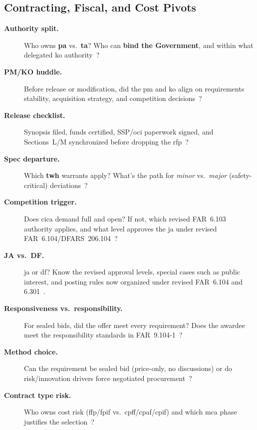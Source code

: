 \documentclass[../main.tex]{subfiles}
\begin{document}
\subsection{Contracting, Fiscal, and Cost Pivots}
\begin{description}
  \item[\textbf{Authority split.}] Who owns \textbf{\ac{pa}} vs.\ \textbf{\ac{ta}}? Who can \textbf{bind the Government}, and within what delegated \ac{ko} authority~\autocite{SECNAV5400-15D,SECNAV5000-2G,FAR-1-602-Contracting-Officer-Authority}?
  \item[\textbf{PM/KO huddle.}] Before release or modification, did the \ac{pm} and \ac{ko} align on requirements stability, acquisition strategy, and competition decisions~\autocite{DoDI5000-85,edo-3-2-1-intro-contracting-2025}?
  \item[\textbf{Release checklist.}] Synopsis filed, funds certified, SSP/\ac{oci} paperwork signed, and Sections~L/M synchronized before dropping the \ac{rfp}~\autocite{FAR-5-101-Disseminating-Information,FAR-15-304-Evaluation-Factors,NAVSEA-Source-Selection-Guide-2022,edo-3-2-2-solicitation-prep-2025}?
  \item[\textbf{Spec departure.}] Which \textbf{\ac{twh}} warrants apply? What's the path for \emph{minor} vs.\ \emph{major} (safety-critical) deviations~\autocite{SECNAV5400-15D}?
  \item[\textbf{Competition trigger.}] Does \ac{cica} demand full and open? If not, which revised FAR~6.103 authority applies, and what level approves the \acs{ja} under revised FAR~6.104/DFARS~206.104~\autocite{USC-3201-CICA,FAR-Overhaul-Part6-2026,DoD-RFO-Deviation-Part6-2026}?
  \item[\textbf{JA vs.\ DF.}] \ac{ja} or \ac{df}? Know the revised approval levels, special cases such as public interest, and posting rules now organized under revised FAR~6.104 and 6.301~\autocite{FAR-Overhaul-Part6-2026,DoD-RFO-Deviation-Part6-2026}.
  \item[\textbf{Responsiveness vs.\ responsibility.}] For sealed bids, did the offer meet every requirement? Does the awardee meet the responsibility standards in FAR~9.104-1~\autocite{FAR-9-104-1-General-Standards}?
  \item[\textbf{Method choice.}] Can the requirement be sealed bid (price-only, no discussions) or do risk/innovation drivers force negotiated procurement~\autocite{FAR-Part-15-Contracting-by-Negotiation,FAR-15-101-Best-Value,NAVSEA-Source-Selection-Guide-2022}?
  \item[\textbf{Contract type risk.}] Who owns cost risk (\ac{ffp}/\ac{fpif} vs.\ \ac{cpff}/\ac{cpaf}/\ac{cpif}) and which \ac{mca} phase justifies the selection~\autocite{FAR-16-102-Contract-Type-Policies,FAR-16-103-Negotiating-Contract-Type,DoDI5000-85}?

\end{description}
\end{document}
